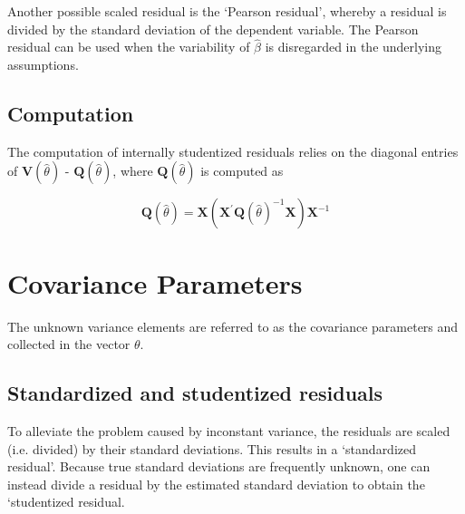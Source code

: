 \documentclass[Main.tex]{subfiles}
\begin{document}
Another possible scaled residual is the  `Pearson residual', whereby a residual is divided by the standard deviation of the dependent variable. The Pearson residual can be used when the variability of $\hat{\beta}$ is disregarded in the underlying assumptions.


\subsection{Computation}%

The computation of internally studentized residuals relies on the diagonal entries of $\boldsymbol{V} (\hat{\theta})$ - $\boldsymbol{Q} (\hat{\theta})$, where $\boldsymbol{Q} (\hat{\theta})$ is computed as

\[ \boldsymbol{Q} (\hat{\theta}) = \boldsymbol{X} ( \boldsymbol{X}^{\prime}\boldsymbol{Q} (\hat{\theta})^{-1}\boldsymbol{X})\boldsymbol{X}^{-1} \]



\section{Covariance Parameters} %
The unknown variance elements are referred to as the covariance parameters and collected in the vector $\theta$.


\subsection{Standardized and studentized residuals} %

To alleviate the problem caused by inconstant variance, the residuals are scaled (i.e. divided) by their standard deviations. This results in a `standardized residual'. Because true standard deviations are frequently unknown, one can instead divide a residual by the estimated standard deviation to obtain the `studentized residual. 



	
	
\end{document}
